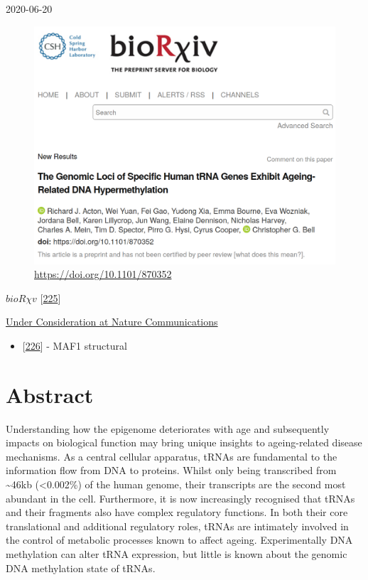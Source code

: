 \documentclass[
]{book}
\providecommand{\tightlist}{%
  \setlength{\itemsep}{0pt}\setlength{\parskip}{0pt}}
\begin{document}
2020-06-20

\begin{figure}
\centering
\includegraphics{figs/biorxiv_screenshot.png}
\caption{\url{https://doi.org/10.1101/870352}}
\end{figure}

\href{https://doi.org/10.1101/870352}{\(bioR \chi v\)} {[}\protect\hyperlink{ref-Acton2020}{225}{]}

\href{https://nature-research-under-consideration.nature.com/users/37265-nature-communications/posts/57741-the-genomic-loci-of-specific-human-trna-genes-exhibit-ageing-related-dna-hypermethylation}{Under Consideration at Nature Communications}

\begin{itemize}
\tightlist
\item
  {[}\protect\hyperlink{ref-Vorlander2020}{226}{]} - MAF1 structural
\end{itemize}

\newpage

\hypertarget{abstract-2}{%
\section{Abstract}\label{abstract-2}}

Understanding how the epigenome deteriorates with age and subsequently impacts on biological function may bring unique insights to ageing-related disease mechanisms. As a central cellular apparatus, tRNAs are fundamental to the information flow from DNA to proteins.
Whilst only being transcribed from \textasciitilde46kb (\textless0.002\%) of the human genome, their transcripts are the second most abundant in the cell.
Furthermore, it is now increasingly recognised that tRNAs and their fragments also have complex regulatory functions.
In both their core translational and additional regulatory roles, tRNAs are intimately involved in the control of metabolic processes known to affect ageing.
Experimentally DNA methylation can alter tRNA expression, but little is known about the genomic DNA methylation state of tRNAs.
\end{document}
